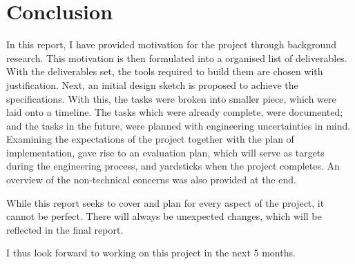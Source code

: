 \section{Conclusion}
In this report, I have provided motivation for the project through background
research.
This motivation is then formulated into a organised list of deliverables.
With the deliverables set, the tools required to build them are chosen with
justification.
Next, an initial design sketch is proposed to achieve the specifications.
With this, the tasks were broken into smaller piece, which were laid onto
a timeline.
The tasks which were already complete, were documented; and the tasks in the
future, were planned with engineering uncertainties in mind.
Examining the expectations of the project together with the plan of
implementation, gave rise to an evaluation plan, which will serve as targets
during the engineering process, and yardsticks when the project completes.
An overview of the non-technical concerns was also provided at the end.

While this report seeks to cover and plan for every aspect of the project, it
cannot be perfect.
There will always be unexpected changes, which will be reflected in the final
report.

I thus look forward to working on this project in the next 5 months.